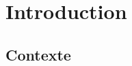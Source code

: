 
\chapter{Introduction} %

\label{Chapter1} %


\newcommand{\keyword}[1]{\textbf{#1}}
\newcommand{\tabhead}[1]{\textbf{#1}}
\newcommand{\code}[1]{\texttt{#1}}
\newcommand{\file}[1]{\texttt{\bfseries#1}}
\newcommand{\option}[1]{\texttt{\itshape#1}}









\section{Contexte}





